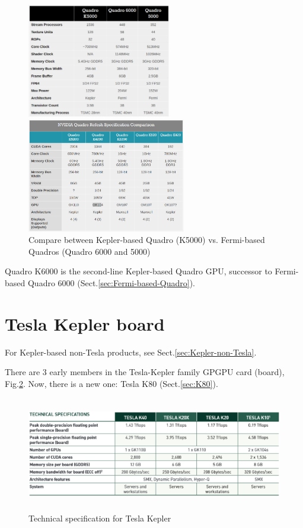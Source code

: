 \begin{figure}[hbt]
  \centerline{\includegraphics[height=5cm,
    angle=0]{./images/Quadro-Kepler.eps}}
  \centerline{\includegraphics[height=5cm,
    angle=0]{./images/Quadro2-Kepler.eps}}
  \caption{Compare between Kepler-based Quadro (K5000) vs. Fermi-based Quadros
  (Quadro 6000 and 5000)}
\label{fig:Quadro-Kepler}
\end{figure}

Quadro K6000 is the second-line Kepler-based Quadro GPU, successor to
Fermi-based Quadro 6000 (Sect.\ref{sec:Fermi-based-Quadro}). 



\section{Tesla Kepler board}
\label{sec:Tesla-Kepler}

For Kepler-based non-Tesla products, see Sect.\ref{sec:Kepler-non-Tesla}.

There are 3 early members in the Tesla-Kepler family GPGPU card (board),
Fig.\ref{fig:Tesla_Kepler_comparison}. Now, there is a new one: Tesla K80
(Sect.\ref{sec:K80}).

\begin{figure}[hbt]
  \centerline{\includegraphics[height=5cm,
    angle=0]{./images/Tesla_Kepler_comparison.eps}}
  \caption{Technical specification for Tesla Kepler}
  \label{fig:Tesla_Kepler_comparison}
\end{figure}

